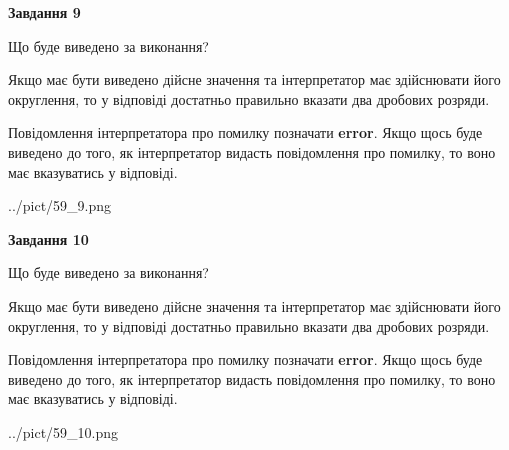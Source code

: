 \documentclass[12pt, ukrainian]{article}
\begin{document}
{\begin {Large}
{\begin {center}\textbf{Завдання 9}\end {center}}\par
Що буде виведено за виконання? \par

Якщо має бути виведено дійсне значення та інтерпретатор має здійснювати його округлення, 
то у відповіді достатньо правильно вказати два дробових розряди.

Повідомлення інтерпретатора про помилку позначати \textbf{error}.
Якщо щось буде виведено до того, як інтерпретатор видасть повідомлення про помилку, 
то воно має вказуватись у відповіді. \par

\begin{center}
	{../pict/59_9.png}
\end{center}
\newpage

{\begin {center}\textbf{Завдання 10}\end {center}}\par
Що буде виведено за виконання? \par

Якщо має бути виведено дійсне значення та інтерпретатор має здійснювати його округлення, 
то у відповіді достатньо правильно вказати два дробових розряди.

Повідомлення інтерпретатора про помилку позначати \textbf{error}.
Якщо щось буде виведено до того, як інтерпретатор видасть повідомлення про помилку, 
то воно має вказуватись у відповіді. \par

\begin{center}
	{../pict/59_10.png}
\end{center}
\newpage

\end {Large}}
\end{document}
